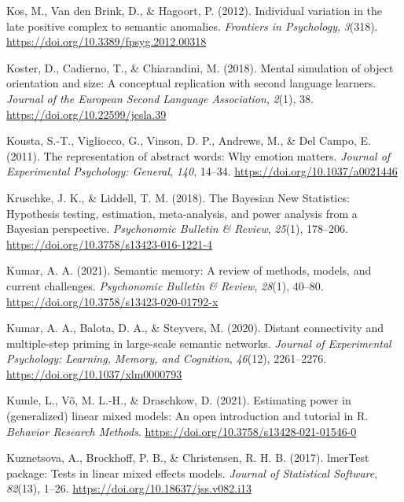 \documentclass[
  12pt,
  man,floatsintext]{apa7}
\newlength{\cslhangindent}
\newlength{\cslentryspacingunit} %
\newenvironment{CSLReferences}[2] %
 {%
  \setlength{\parindent}{0pt}
  \ifodd #1
  \let\oldpar\par
  \def\par{\hangindent=\cslhangindent\oldpar}
  \fi
  \setlength{\parskip}{#2\cslentryspacingunit}
 }%
 {}
\begin{document}
\begin{CSLReferences}{1}{0}
\leavevmode{}%
Kos, M., Van den Brink, D., \& Hagoort, P. (2012). Individual variation in the late positive complex to semantic anomalies. \emph{Frontiers in Psychology}, \emph{3}(318). \url{https://doi.org/10.3389/fpsyg.2012.00318}

\leavevmode{}%
Koster, D., Cadierno, T., \& Chiarandini, M. (2018). Mental simulation of object orientation and size: {A} conceptual replication with second language learners. \emph{Journal of the European Second Language Association}, \emph{2}(1), 38. \url{https://doi.org/10.22599/jesla.39}

\leavevmode{}%
Kousta, S.-T., Vigliocco, G., Vinson, D. P., Andrews, M., \& Del Campo, E. (2011). The representation of abstract words: {Why} emotion matters. \emph{Journal of Experimental Psychology: General}, \emph{140}, 14--34. \url{https://doi.org/10.1037/a0021446}

\leavevmode{}%
Kruschke, J. K., \& Liddell, T. M. (2018). The {Bayesian New Statistics}: {Hypothesis} testing, estimation, meta-analysis, and power analysis from a {Bayesian} perspective. \emph{Psychonomic Bulletin \& Review}, \emph{25}(1), 178--206. \url{https://doi.org/10.3758/s13423-016-1221-4}

\leavevmode{}%
Kumar, A. A. (2021). Semantic memory: {A} review of methods, models, and current challenges. \emph{Psychonomic Bulletin \& Review}, \emph{28}(1), 40--80. \url{https://doi.org/10.3758/s13423-020-01792-x}

\leavevmode{}%
Kumar, A. A., Balota, D. A., \& Steyvers, M. (2020). Distant connectivity and multiple-step priming in large-scale semantic networks. \emph{Journal of Experimental Psychology: Learning, Memory, and Cognition}, \emph{46}(12), 2261--2276. \url{https://doi.org/10.1037/xlm0000793}

\leavevmode{}%
Kumle, L., Võ, M. L.-H., \& Draschkow, D. (2021). Estimating power in (generalized) linear mixed models: {An} open introduction and tutorial in {R}. \emph{Behavior Research Methods}. \url{https://doi.org/10.3758/s13428-021-01546-0}

\leavevmode{}%
Kuznetsova, A., Brockhoff, P. B., \& Christensen, R. H. B. (2017). {lmerTest} package: Tests in linear mixed effects models. \emph{Journal of Statistical Software}, \emph{82}(13), 1--26. \url{https://doi.org/10.18637/jss.v082.i13}


\end{CSLReferences}
\end{document}
